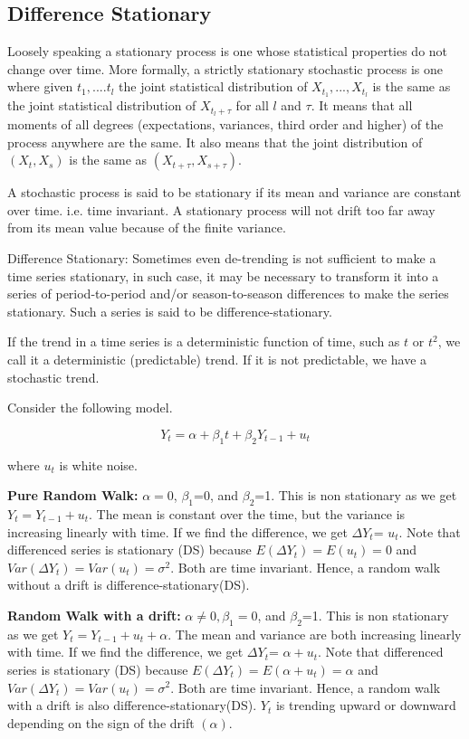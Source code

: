 \subsection{Difference Stationary }
Loosely speaking a stationary process is one whose statistical properties do not change over time. More formally, a strictly stationary stochastic process is one where given $t_1,....t_l$ the joint statistical distribution of $X_{t_1},...,X_{t_l}$ is the same as the joint statistical distribution of $X_{t_l+\tau}$ for all $l$ and $\tau$. It means that all moments of all degrees (expectations, variances, third order and higher) of the process anywhere are the same. It also means that the joint distribution of $(X_t,X_s)$ is the same as $(X_{t+\tau},X_{s+\tau})$.

A stochastic process is said to be stationary if its mean and variance are constant over time. i.e. time invariant. A stationary process will not drift too far away from its mean value because of the finite variance. 

Difference Stationary: Sometimes even de-trending is not sufficient to make a time series stationary, in such case, it may be necessary to transform it into a series of period-to-period and/or season-to-season differences to make the series stationary. Such a series is said to be difference-stationary.


If the trend in a time series is a deterministic function of time, such as $t$ or $t^2$, we call it a deterministic (predictable) trend. If it is not predictable, we have a stochastic trend. 

Consider the following model. 

\begin{equation}
Y_t = \alpha +\beta_{1}t +\beta_{2}Y_{t-1}+u_t 
\end{equation}

where $u_t$ is white noise.

\textbf{Pure Random Walk:} $\alpha = 0$, $\beta_1$=0, and $\beta_2$=1. This is non stationary as we get $Y_t = Y_{t-1} + u_t$. The mean is constant over the time, but the variance is increasing linearly with time. If we find the difference, we get $\Delta Y_t$= $u_t$. Note that differenced series is stationary (DS) because \textit{$E(\Delta Y_t) = E(u_t) =0$ } and \textit { $Var(\Delta Y_t) = Var(u_t) = \sigma^2$}. Both are time invariant. Hence, a random walk without a drift is difference-stationary(DS).


\textbf{Random Walk with a drift:} $\alpha \neq 0, \beta_1=0$, and $\beta_2$=1. This is non stationary as we get $Y_t = Y_{t-1} + u_t + \alpha$. The mean and variance are both increasing linearly with time. If we find the difference, we get $\Delta Y_t$= $\alpha + u_t$. Note that differenced series is stationary (DS) because \textit{$ E(\Delta Y_t)= E(\alpha + u_t) =\alpha$} and \textit {$Var(\Delta Y_t) = Var(u_t) = \sigma^2$}. Both are time invariant. Hence, a random walk with a drift is also difference-stationary(DS). $Y_t$ is trending upward or downward depending on the sign of the drift $(\alpha)$.

